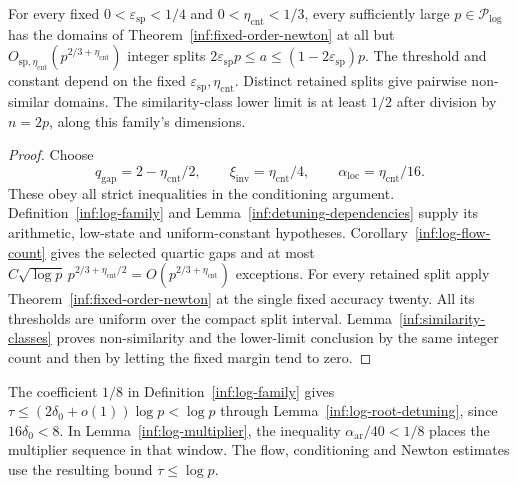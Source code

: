 \begin{proposition}\label{inf:log-assembly}
For every fixed $0<\varepsilon_{\mathrm{sp}}<1/4$ and $0<\eta_{\mathrm{cnt}}<1/3$,
every sufficiently large $p\in\mathcal P_{\log}$ has the domains of
Theorem~\ref{inf:fixed-order-newton} at all but
$O_{\mathrm{sp},\eta_{\mathrm{cnt}}}(p^{2/3+\eta_{\mathrm{cnt}}})$ integer splits
$2\varepsilon_{\mathrm{sp}}p\le a\le(1-2\varepsilon_{\mathrm{sp}})p$.
The threshold and constant depend on the fixed
$\varepsilon_{\mathrm{sp}},\eta_{\mathrm{cnt}}$.
Distinct retained splits give pairwise non-similar domains.
The similarity-class lower limit is at least $1/2$ after division
by $n=2p$, along this family's dimensions.
\end{proposition}
\begin{proof}
Choose
\[
 q_{\mathrm{gap}}=2-\eta_{\mathrm{cnt}}/2,\qquad
 \xi_{\mathrm{inv}}=\eta_{\mathrm{cnt}}/4,\qquad
 \alpha_{\mathrm{loc}}=\eta_{\mathrm{cnt}}/16.
\]
These obey all strict inequalities in the conditioning argument.
Definition~\ref{inf:log-family} and
Lemma~\ref{inf:detuning-dependencies} supply its arithmetic,
low-state and uniform-constant hypotheses.
Corollary~\ref{inf:log-flow-count} gives the selected quartic gaps
and at most $C\sqrt{\log p}\,p^{2/3+\eta_{\mathrm{cnt}}/2}
=O(p^{2/3+\eta_{\mathrm{cnt}}})$ exceptions.
For every retained split apply Theorem~\ref{inf:fixed-order-newton}
at the single fixed accuracy twenty. All its thresholds are
uniform over the compact split interval. Lemma~\ref{inf:similarity-classes}
proves non-similarity and the lower-limit conclusion by the same
integer count and then by letting the fixed margin tend to zero.
\end{proof}

\begin{remark}\label{inf:log-window-constant}
The coefficient $1/8$ in Definition~\ref{inf:log-family} gives
$\tau\le(2\delta_0+o(1))\log p<\log p$ through
Lemma~\ref{inf:log-root-detuning}, since $16\delta_0<8$.
In Lemma~\ref{inf:log-multiplier}, the inequality
$\alpha_{\mathrm{ar}}/40<1/8$ places the multiplier sequence in
that window. The flow, conditioning and Newton estimates use the
resulting bound $\tau\le\log p$.
\end{remark}
